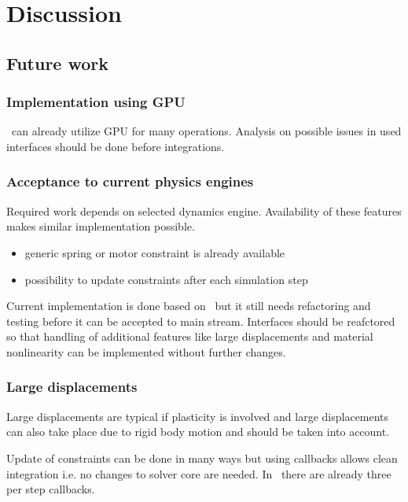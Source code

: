 \section{Discussion}

\subsection{Future work}
\label{subsec:futureWork}

\subsubsection{Implementation using GPU}
\bullet\ can already utilize GPU for many operations. 
Analysis on possible issues in used interfaces should be done before integrations.

\subsubsection{Acceptance to current physics engines}

Required work depends on selected dynamics engine. Availability of these features makes similar 
implementation possible.

\begin{itemize}
\item generic spring or motor constraint is already available 
\item possibility to update constraints after each simulation step
\end{itemize}

Current implementation is done based on \bullet\ but it still needs refactoring and testing before it can be 
accepted to main stream. Interfaces should be reafctored so that handling of additional features like large 
displacements and material nonlinearity can be implemented without further changes.

\subsubsection{Large displacements}
Large displacements are typical if plasticity is involved and
large displacements can also take place due to rigid body motion and should be taken into account.

Update of constraints can be done in  many ways but using callbacks allows clean integration i.e. no changes
to solver core are needed.
In \bullet\ there are already three per step callbacks. 

